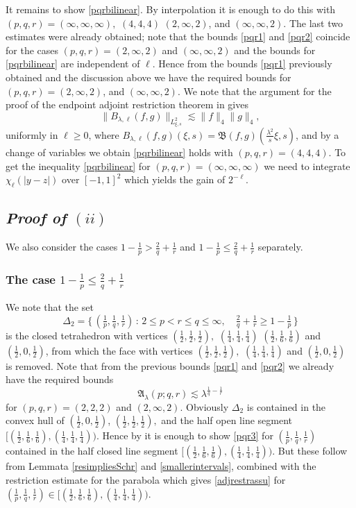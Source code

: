 \documentclass[11pt]{amsart}
\theoremstyle{definition}
\numberwithin{theorem}{section}
\numberwithin{definition}{section}
\numberwithin{equation}{section}
\newcommand{\Be}{\begin{equation}}
\newcommand{\Ee}{\end{equation}}
\renewcommand{\le}{\leqslant}
\renewcommand{\ge}{\geqslant}
\def\lc{\lesssim}
\def\la{\lambda}             \def\La{\Lambda}
\def\fA{{\mathfrak {A}}}
\def\fB{{\mathfrak {B}}}
\renewcommand{\le}{\leqslant}
\renewcommand{\ge}{\geqslant}
\begin{document}
It remains to show \eqref{pqrbilinear}. By interpolation it is enough to do this with $(p,q,r)=(\infty,\infty,\infty),$ $(4, 4, 4)$
$(2, \infty,2)$, and $(\infty, \infty,2)$. The last two estimates were already obtained;
 note that the bounds \eqref{pqr1} and \eqref{pqr2} coincide
for the cases   $(p,q,r)=(2, \infty,2)$ and $(\infty, \infty,2)$ and  the bounds
for \eqref{pqrbilinear} are independent of $\ell$. Hence  from the  bounds \eqref{pqr1}  previously obtained
and the discussion above  we have the required bounds for
$(p,q,r)=(2, \infty,2)$, and $(\infty, \infty,2)$.
 We  note  that the argument for the proof of the endpoint adjoint restriction  theorem in \cite{hoer2}
gives
\Be \label{44bil}
\|B_{\la,\ell} (f,g)\|_{L^2_{\xi, s }} \lc \|f\|_4 \|g\|_4,
\Ee
uniformly
 in $\ell\ge 0$, where $B_{\la,\ell} (f,g) (\xi, s )=\fB(f,g) (\tfrac{\la^2}{ s }\xi, s )$, and by a change of variables we obtain
\eqref{pqrbilinear}
holds with $(p,q,r)=(4,4,4)$.
To get the inequality \eqref{pqrbilinear}  for $(p,q,r)=(\infty,\infty,\infty)$
we  need to  integrate $\chi_\ell(|y-z|)$ over
$[-1,1]^2$ which yields  the gain of $2^{-\ell}$.


\subsection{\it Proof of $(ii)$} We also consider the cases $1-\frac 1p>
\frac 2q+\frac 1r$ and $1-\frac 1p\le
\frac 2q+\frac 1r$ separately.




\subsubsection*{The case $1-\frac 1p\le
\frac 2q+\frac 1r$} We note that the set
\[ \Delta_2=\big\{\,(\tfrac1p, \tfrac1q,\tfrac1r)\,:\,  2\le p<r\le q\le \infty,\quad \tfrac 2q+\tfrac 1r \ge 1-\tfrac 1p\,\big\}\]
is the closed tetrahedron with vertices $(\frac12,\frac12,\frac12),$
$(\frac14, \frac14, \frac14)$ $(\frac12, \frac16,\frac16)$ and
$(\frac12, 0,\frac12)$, from which the face with vertices
$(\frac12,\frac12,\frac12),$ $(\frac14, \frac14, \frac14)$ and
$(\frac12, 0,\frac12)$ is removed. Note that from the previous
bounds \eqref{pqr1} and \eqref{pqr2}  we already have the required
bounds \Be\label{pqr3}\fA_\la(p;q,r)\lc \lambda^{\frac1q-\frac1r}\Ee
for $(p,q,r)=(2,2,2)$ and $(2,\infty,2)$. Obviously $\Delta_2$ is
contained in  the convex hull of $(\frac12, 0,\frac12)$,
$(\frac12,\frac12,\frac12),$ and the half open line segment
$[(\frac12, \frac16,\frac16), (\frac14, \frac14, \frac14))$. Hence
by it is enough to show \eqref{pqr3} for $(\frac1p,\frac1q,\frac1r)$
contained in the half closed line segment $[(\frac12,
\frac16,\frac16), (\frac14, \frac14, \frac14))$. But these follow
from Lemmata \ref{resimpliesSchr} and \ref{smallerintervals}, combined with the
restriction estimate for the parabola which gives
\eqref{adjrestrassu} for $(\frac1p,\frac1q,\frac1r)\in [(\frac12,
\frac16,\frac16), (\frac14, \frac14, \frac14))$.
\end{document}
